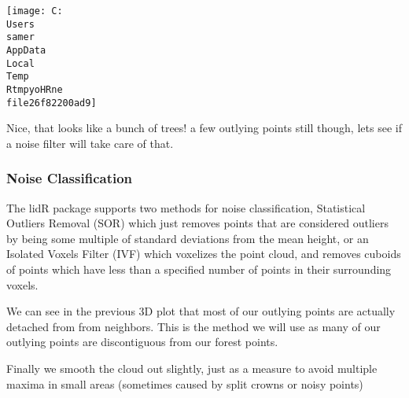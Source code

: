 \documentclass[
]{article}
\newenvironment{Shaded}{\begin{snugshade}}{\end{snugshade}}
\newcommand{\AttributeTok}[1]{\textcolor[rgb]{0.77,0.63,0.00}{#1}}
\newcommand{\DecValTok}[1]{\textcolor[rgb]{0.00,0.00,0.81}{#1}}
\newcommand{\FunctionTok}[1]{\textcolor[rgb]{0.00,0.00,0.00}{#1}}
\newcommand{\NormalTok}[1]{#1}
\newcommand{\OtherTok}[1]{\textcolor[rgb]{0.56,0.35,0.01}{#1}}
\newcommand{\SpecialCharTok}[1]{\textcolor[rgb]{0.00,0.00,0.00}{#1}}
\newcommand{\StringTok}[1]{\textcolor[rgb]{0.31,0.60,0.02}{#1}}
\begin{document}
\texttt{[image: C:\\Users\\samer\\AppData\\Local\\Temp\\RtmpyoHRne\\file26f82200ad9]}

Nice, that looks like a bunch of trees! a few outlying points still
though, lets see if a noise filter will take care of that.

\hypertarget{noise-classification}{%
\subsubsection{Noise Classification}\label{noise-classification}}

The lidR package supports two methods for noise classification,
Statistical Outliers Removal (SOR) which just removes points that are
considered outliers by being some multiple of standard deviations from
the mean height, or an Isolated Voxels Filter (IVF) which voxelizes the
point cloud, and removes cuboids of points which have less than a
specified number of points in their surrounding voxels.

We can see in the previous 3D plot that most of our outlying points are
actually detached from from neighbors. This is the method we will use as
many of our outlying points are discontiguous from our forest points.

Finally we smooth the cloud out slightly, just as a measure to avoid
multiple maxima in small areas (sometimes caused by split crowns or
noisy points)

\begin{Shaded}
\end{Shaded}
\end{document}

